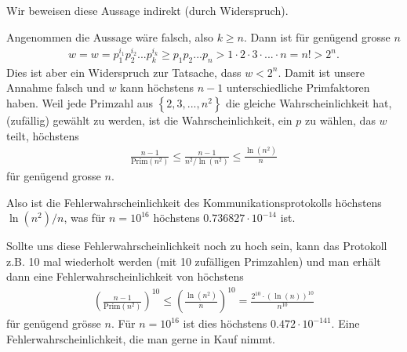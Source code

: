 \begin{enumerate}
    Wir beweisen diese Aussage indirekt (durch Widerspruch).
    
    Angenommen die Aussage wäre falsch, also $k\geq n$. Dann ist für genügend grosse $n$
    \begin{align*}
        w = w = p_1^{i_1}p_2^{i_2}...p_k^{i_k} \geq p_1p_2...p_n > 1\cdot 2\cdot 3\cdot ... \cdot n = n! > 2^n.
    \end{align*}
    Dies ist aber ein Widerspruch zur Tatsache, dass $w < 2^n$. Damit ist unsere Annahme falsch und $w$ kann höchstens $n-1$ unterschiedliche Primfaktoren haben. Weil jede Primzahl aus $\left\{2,3,...,n^2\right\}$ die gleiche Wahrscheinlichkeit hat, (zufällig) gewählt zu werden, ist die Wahrscheinlichkeit, ein $p$ zu wählen, das $w$ teilt, höchstens
\begin{align*}
    \frac{n-1}{\text{Prim}(n^2)}\leq \frac{n-1}{n^2/\ln(n^2)}\leq\frac{\ln(n^2)}{n}
\end{align*}
    für genügend grosse $n$.
    
    Also ist die Fehlerwahrscheinlichkeit des Kommunikationsprotokolls höchstens $\ln(n^2)/n$, was für $n=10^{16}$ höchstens $0.736827\cdot 10^{-14}$ ist.
\end{enumerate}
Sollte uns diese Fehlerwahrscheinlichkeit noch zu hoch sein, kann das Protokoll z.B. 10 mal wiederholt werden (mit 10 zufälligen Primzahlen) und man erhält dann eine Fehlerwahrscheinlichkeit von höchstens
    \begin{align*}
        \left(\frac{n-1}{\text{Prim}(n^2)}\right)^{10}\leq \left(\frac{\ln(n^2)}{n}\right)^{10} = \frac{2^{10}\cdot (\ln(n))^{10}}{n^{10}}
    \end{align*}
    für genügend grösse $n$. Für $n = 10^{16}$ ist dies höchstens $0.472\cdot 10^{-141}$. Eine Fehlerwahrscheinlichkeit, die man gerne in Kauf nimmt.
    
